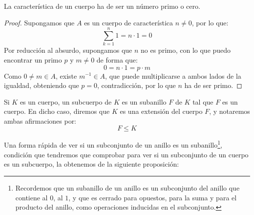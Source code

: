 \begin{prop}\label{prop:carac_primo}
    La característica de un cuerpo ha de ser un número primo o cero.
    \begin{proof}
        Supongamos que $A$ es un cuerpo de característica $n\neq 0$, por lo que:
        \begin{equation*}
            \sum_{k=1}^{n}1 = n\cdot 1 = 0
        \end{equation*}
        Por reducción al absurdo, supongamos que $n$ no es primo, con lo que puedo encontrar un primo $p$ y $m\neq 0$ de forma que:
        \begin{equation*}
            0 = n\cdot 1 = p\cdot m
        \end{equation*}
        Como $0\neq m \in A$, existe $m^{-1}\in A$, que puede multiplicarse a ambos lados de la igualdad, obteniendo que $p = 0$, contradicción, por lo que $n$ ha de ser primo.
    \end{proof}
\end{prop}

\begin{definicion}
    Si $K$ es un cuerpo, un subcuerpo de $K$ es un subanillo $F$ de $K$ tal que $F$ es un cuerpo. En dicho caso, diremos que $K$ es una extensión del cuerpo $F$, y notaremos ambas afirmaciones por:
    \begin{equation*}
        F\leq K
    \end{equation*}
\end{definicion}

\noindent
Una forma rápida de ver si un subconjunto de un anillo es un subanillo\footnote{Recordemos que un subanillo de un anillo es un subconjunto del anillo que contiene al $0$, al $1$, y que es cerrado para opuestos, para la suma y para el producto del anillo, como operaciones inducidas en el subconjunto.}, condición que tendremos que comprobar para ver si un subconjunto de un cuerpo es un subcuerpo, la obtenemos de la siguiente proposición:

